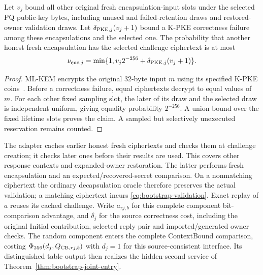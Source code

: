 \begin{lemma}
\label{lem:bootstrap-validation}
Let $v_j$ bound all other original fresh encapsulation-input slots under
the selected PQ public-key bytes, including unused and failed-retention
draws and restored-owner validation draws. Let
$\delta_{{\rm PKE},j}(v_j+1)$ bound a K-PKE correctness failure among
these encapsulations and the selected one. The probability that another
honest fresh encapsulation has the selected challenge ciphertext is at most
\begin{equation}
 \nu_{{\rm enc},j}=\min\{1,v_j2^{-256}
                   +\delta_{{\rm PKE},j}(v_j+1)\}.
 \label{eq:bootstrap-validation}
\end{equation}
\end{lemma}
\begin{proof}
ML-KEM encrypts the original 32-byte input $m$ using its specified
K-PKE coins~\cite[Algorithms~14, 15, 17 and 18]{fips203}. Before a
correctness failure, equal ciphertexts decrypt to equal values of $m$.
For each other fixed sampling slot, the later of its draw and the
selected draw is independent uniform, giving equality probability
$2^{-256}$. A union bound over the fixed lifetime slots proves the
claim. A sampled but selectively unexecuted reservation remains counted.
\end{proof}

The adapter caches earlier honest fresh ciphertexts and checks them at
challenge creation; it checks later ones before their results are used.
This covers other response contexts and expanded-owner restoration.
The latter performs fresh encapsulation and an expected/recovered-secret
comparison. On a nonmatching ciphertext the ordinary decapsulation oracle
therefore preserves the actual validation; a matching ciphertext incurs
\eqref{eq:bootstrap-validation}. Exact replay of $a$ reuses its cached
challenge. Write $a_{rj,b}$ for this complete component bit-comparison
advantage, and $\delta_j$ for the source correctness cost, including the
original Initial contribution, selected reply pair and imported/generated
owner checks. The random component enters the complete ContextBound
comparison, costing $\Phi_{256}(d_j,Q_{{\rm CB},rj,b})$ with $d_j=1$
for this source-consistent interface. Its distinguished table output
then realizes the hidden-second service of
Theorem~\ref{thm:bootstrap-joint-entry}.

